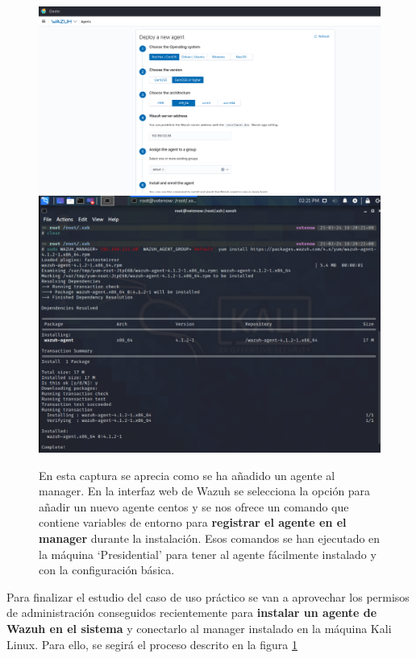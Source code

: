 \begin{figure}[!hbt]
  \centering
  \includegraphics[width=\textwidth]{imagenes/install_wazuh1.png}
  \includegraphics[width=\textwidth]{imagenes/install_wazuh2.png}
  \caption{En esta captura se aprecia como se ha añadido un agente al manager. En la interfaz web de Wazuh se selecciona la opción para añadir un nuevo agente centos y se nos ofrece un comando que contiene variables de entorno para \textbf{registrar el agente en el manager} durante la instalación. Esos comandos se han ejecutado en la máquina `Presidential' para tener al agente fácilmente instalado y con la configuración básica.}
   \label{install_wazuh}
\end{figure}

Para finalizar el estudio del caso de uso práctico se van a aprovechar los permisos de administración conseguidos recientemente para \textbf{instalar un agente de Wazuh en el sistema} y conectarlo al manager instalado en la máquina Kali Linux. Para ello, se segirá el proceso descrito en la figura \ref{install_wazuh}

